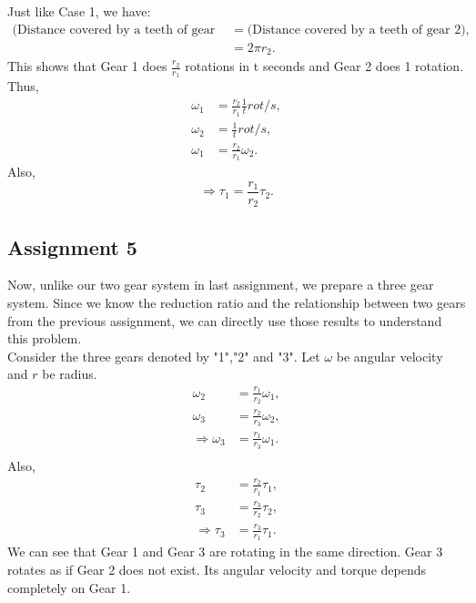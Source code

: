 \documentclass[12pt,a4paper]{report}
\begin{document}
Just like Case 1, we have:
\begin{align}
    \text{(Distance covered by a teeth of gear 1)} &= \text{(Distance covered by a teeth of gear 2)}, \\
                                                       &= 2\pi r_2.
\end{align}
This shows that Gear 1 does \(\frac{r_2}{r_1}\) rotations in t seconds and Gear 2 does 1 rotation. 
Thus, 
\begin{align}
    \omega_1&=\frac{r_2}{r_1} \frac{1}{t} rot/s,\\
    \omega_2 &= \frac{1}{t} rot/s, \\
    \omega_1 &= \frac{r_2}{r_1}\omega_2.
\end{align}
Also,
\begin{equation}
    \Rightarrow \tau_1 = \frac{r_1}{r_2} \tau_2.
\end{equation}

\subsection{\textbf{Assignment 5}}
Now, unlike our two gear system in last assignment, we prepare a three gear system. 
Since we know the reduction ratio and the relationship between two gears from the previous assignment, we can directly 
use those results to understand this problem. \\
Consider the three gears denoted by "1","2" and "3". Let \(\omega\) be angular velocity and \(r\) be radius. \\
\begin{align}
    \omega_2&=\frac{r_1}{r_2}\omega_1,\\
    \omega_3&=\frac{r_2}{r_3}\omega_2,\\
    \Rightarrow \omega_3&=\frac{r_1}{r_3}\omega_1.\\
\end{align}
Also, 
\begin{align}
    \tau_2&=\frac{r_2}{r_1}\tau_1,\\
    \tau_3&=\frac{r_3}{r_2}\tau_2,\\
    \Rightarrow \tau_3&=\frac{r_3}{r_1}\tau_1.
\end{align}
We can see that Gear 1 and Gear 3 are rotating in the same direction. Gear 3 rotates as if Gear 2 does not exist. 
Its angular velocity and torque depends completely on Gear 1. 
\end{document}
